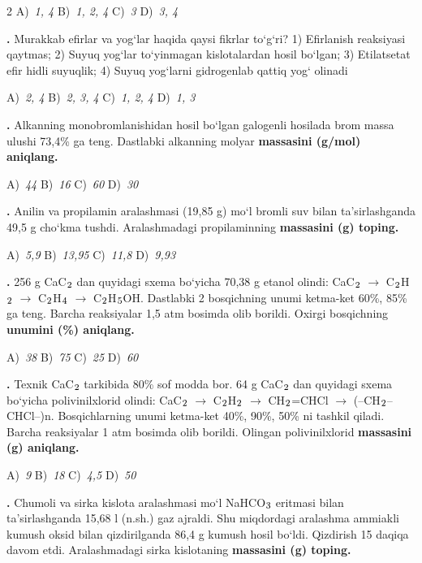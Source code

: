 \documentclass[11pt,a4paper]{article}
\renewcommand{\textsubscript}[1]{\ensuremath{_{\text{\fontsize{8}{8}\selectfont #1}}}}
\newcommand{\qn}[1]{\textbf{\fontsize{11.5}{13}\selectfont #1}}
\newcommand{\qsep}{\par\vspace{13pt}}
\begin{document}
\begin{multicols}{2}
\noindent A)~\textsl{1, 4} \hfill B)~\textsl{1, 2, 4} \hfill C)~\textsl{3} \hfill D)~\textsl{3, 4}\par
\qsep
\noindent\qn{22.} Murakkab efirlar va yog`lar haqida qaysi fikrlar to`g`ri? 1) Efirlanish reaksiyasi qaytmas; 2) Suyuq yog`lar to`yinmagan kislotalardan hosil bo`lgan; 3) Etilatsetat efir hidli suyuqlik; 4) Suyuq yog`larni gidrogenlab qattiq yog` olinadi

\noindent A)~\textsl{2, 4} \hfill B)~\textsl{2, 3, 4} \hfill C)~\textsl{1, 2, 4} \hfill D)~\textsl{1, 3}\par
\qsep
\noindent\qn{23.} Alkanning monobromlanishidan hosil bo`lgan galogenli hosilada brom massa ulushi 73,4\% ga teng. Dastlabki alkanning molyar \textbf{massasini (g/mol) aniqlang.}

\noindent A)~\textsl{44} \hfill B)~\textsl{16} \hfill C)~\textsl{60} \hfill D)~\textsl{30}\par
\qsep
\noindent\qn{24.} Anilin va propilamin aralashmasi (19,85 g) mo`l bromli suv bilan ta'sirlashganda 49,5 g cho`kma tushdi. Aralashmadagi propilaminning \textbf{massasini (g) toping.}

\noindent A)~\textsl{5,9} \hfill B)~\textsl{13,95} \hfill C)~\textsl{11,8} \hfill D)~\textsl{9,93}\par
\qsep
\noindent\qn{25.} 256 g CaC\textsubscript{2} dan quyidagi sxema bo`yicha 70,38 g etanol olindi: CaC\textsubscript{2} $\to$ C\textsubscript{2}H\textsubscript{2} $\to$ C\textsubscript{2}H\textsubscript{4} $\to$ C\textsubscript{2}H\textsubscript{5}OH. Dastlabki 2 bosqichning unumi ketma-ket 60\%, 85\% ga teng. Barcha reaksiyalar 1,5 atm bosimda olib borildi. Oxirgi bosqichning \textbf{unumini (\%) aniqlang.}

\noindent A)~\textsl{38} \hfill B)~\textsl{75} \hfill C)~\textsl{25} \hfill D)~\textsl{60}\par
\qsep
\noindent\qn{26.} Texnik CaC\textsubscript{2} tarkibida 80\% sof modda bor. 64 g CaC\textsubscript{2} dan quyidagi sxema bo`yicha polivinilxlorid olindi: CaC\textsubscript{2} $\to$ C\textsubscript{2}H\textsubscript{2} $\to$ CH\textsubscript{2}=CHCl $\to$ (--CH\textsubscript{2}--CHCl--)n. Bosqichlarning unumi ketma-ket 40\%, 90\%, 50\% ni tashkil qiladi. Barcha reaksiyalar 1 atm bosimda olib borildi. Olingan polivinilxlorid \textbf{massasini (g) aniqlang.}

\noindent A)~\textsl{9} \hfill B)~\textsl{18} \hfill C)~\textsl{4,5} \hfill D)~\textsl{50}\par
\qsep
\noindent\qn{27.} Chumoli va sirka kislota aralashmasi mo`l NaHCO\textsubscript{3} eritmasi bilan ta'sirlashganda 15,68 l (n.sh.) gaz ajraldi. Shu miqdordagi aralashma ammiakli kumush oksid bilan qizdirilganda 86,4 g kumush hosil bo`ldi. Qizdirish 15 daqiqa davom etdi. Aralashmadagi sirka kislotaning \textbf{massasini (g) toping.}


\end{multicols}
\end{document}

